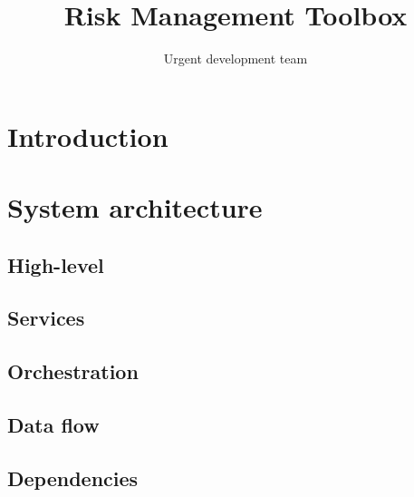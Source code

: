 \documentclass{article}
\title{Risk Management Toolbox}
\author{Urgent development team}
\begin{document}
	\maketitle
	\section{Introduction}
	\section{System architecture}
	\subsection{High-level}
	\subsection{Services}
	
	
	
	
	\subsection{Orchestration}
	\subsection{Data flow}
	\subsection{Dependencies}
\end{document}
